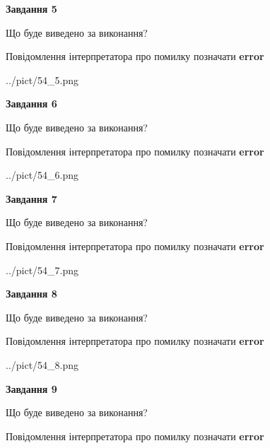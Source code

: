 \documentclass[11pt, ukrainian]{article}
\begin{document}
{\begin {large}
{\begin {center}\textbf{Завдання 5}\end {center}}\par
Що буде виведено за виконання? \par
Повідомлення інтерпретатора про помилку позначати \textbf{error}

\begin{center}
	{../pict/54_5.png}
\end{center}
\newpage

{\begin {center}\textbf{Завдання 6}\end {center}}\par
Що буде виведено за виконання? \par
Повідомлення інтерпретатора про помилку позначати \textbf{error}

\begin{center}
	{../pict/54_6.png}
\end{center}
\newpage

{\begin {center}\textbf{Завдання 7}\end {center}}\par
Що буде виведено за виконання? \par
Повідомлення інтерпретатора про помилку позначати \textbf{error}

\begin{center}
	{../pict/54_7.png}
\end{center}
\newpage

{\begin {center}\textbf{Завдання 8}\end {center}}\par
Що буде виведено за виконання? \par
Повідомлення інтерпретатора про помилку позначати \textbf{error}

\begin{center}
	{../pict/54_8.png}
\end{center}
\newpage

{\begin {center}\textbf{Завдання 9}\end {center}}\par
Що буде виведено за виконання? \par
Повідомлення інтерпретатора про помилку позначати \textbf{error}


\end{large}}
\end{document}
